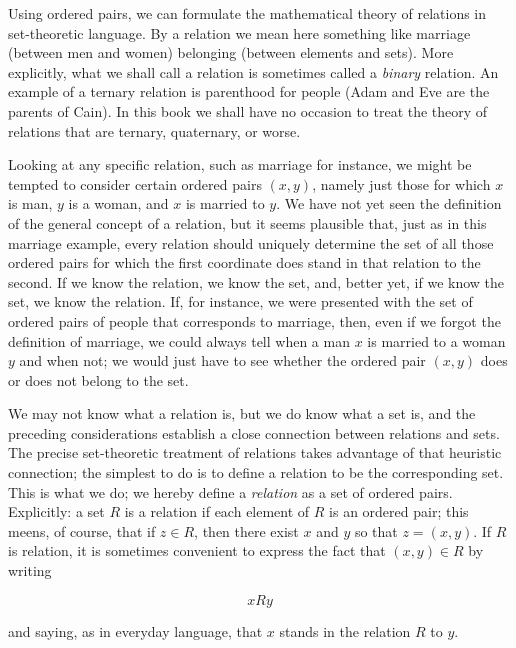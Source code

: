 
Using ordered pairs, we can formulate the mathematical theory of relations in set-theoretic language. By a relation we mean here something like marriage (between men and women) belonging (between elements and sets).  More explicitly, what we shall call a relation is sometimes called a \textit{binary} relation. An example of a ternary relation is parenthood for people (Adam and Eve are the parents of Cain). In this book we shall have no occasion to treat the theory of relations that are ternary, quaternary, or worse. 

Looking at any specific relation, such as marriage for instance, we might be tempted to consider certain ordered pairs $(x,y)$, namely just those for which $x$ is man, $y$ is a woman, and $x$ is married to $y$. We have not yet seen the definition of the general concept of a relation, but it seems plausible that, just as in this marriage example, every relation should uniquely determine the set of all those ordered pairs for which the first coordinate does stand in that relation to the second. If we know the relation, we know the set, and, better yet, if we know the set, we know the relation. If, for instance, we were presented with the set of ordered pairs of people that corresponds to marriage, then, even if we forgot the definition of marriage, we could always tell when a man $x$ is married to a woman $y$ and when not; we would just have to see whether the ordered pair $(x,y)$ does or does not belong to the set.

We may not know what a relation is, but we do know what a set is, and the preceding considerations establish a close connection between relations and sets. The precise set-theoretic treatment of relations takes advantage of that heuristic connection; the simplest to do is to define a relation to be the corresponding set. This is what we do; we hereby define a \textit{relation} as a set of ordered pairs. Explicitly: a set $R$ is a relation if each element of $R $ is an ordered pair; this meens, of course, that if $z \in R $, then there exist $x$ and $y$ so that $z = (x,y)$. If $R $ is relation, it is sometimes convenient to express the fact that $(x, y) \in R $ by writing 

\begin{equation*}
x R y
\end{equation*}

and saying, as in everyday language, that $x$ stands in the relation $R $ to $y$. 

